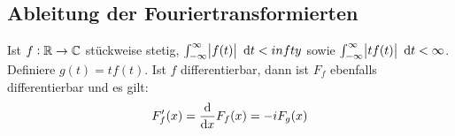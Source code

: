 \subsection{Ableitung der Fouriertransformierten}
Ist $f: \mathbb{R} \to \mathbb{C}$ stückweise stetig, $\int_{-\infty}^\infty \abs{f(t)} \text{ d}t < infty$ sowie
$\int_{-\infty}^\infty \abs{t f(t)}\text{ d}t < \infty$. Definiere $g(t) = t f(t)$. Ist $f$ differentierbar, dann ist 
$F_f$ ebenfalls differentierbar und es gilt:
\begin{equation*}
    F_f'(x) = \dfrac{\text{d}}{\text{d}x} F_f(x) = -i F_g(x)
\end{equation*}
